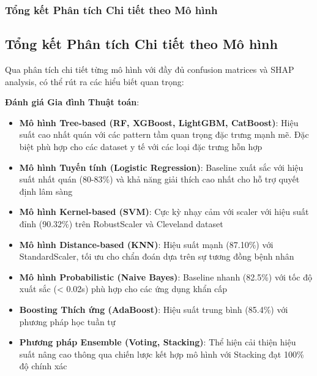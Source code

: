 \subsubsection{Tổng kết Phân tích Chi tiết theo Mô hình}

\subsection{Tổng kết Phân tích Chi tiết theo Mô hình}\label{subsec:detailed-model-summary}

Qua phân tích chi tiết từng mô hình với đầy đủ confusion matrices và SHAP analysis, có thể rút ra các hiểu biết quan trọng:

\textbf{Đánh giá Gia đình Thuật toán}:
\begin{itemize}[leftmargin=*]
    \item \textbf{Mô hình Tree-based (RF, XGBoost, LightGBM, CatBoost)}: Hiệu suất cao nhất quán với các pattern tầm quan trọng đặc trưng mạnh mẽ. Đặc biệt phù hợp cho các dataset y tế với các loại đặc trưng hỗn hợp
    \item \textbf{Mô hình Tuyến tính (Logistic Regression)}: Baseline xuất sắc với hiệu suất nhất quán (80-83\%) và khả năng giải thích cao nhất cho hỗ trợ quyết định lâm sàng
    \item \textbf{Mô hình Kernel-based (SVM)}: Cực kỳ nhạy cảm với scaler với hiệu suất đỉnh (90.32\%) trên RobustScaler và Cleveland dataset
    \item \textbf{Mô hình Distance-based (KNN)}: Hiệu suất mạnh (87.10\%) với StandardScaler, tối ưu cho chẩn đoán dựa trên sự tương đồng bệnh nhân
    \item \textbf{Mô hình Probabilistic (Naive Bayes)}: Baseline nhanh (82.5\%) với tốc độ xuất sắc (< 0.02s) phù hợp cho các ứng dụng khẩn cấp
    \item \textbf{Boosting Thích ứng (AdaBoost)}: Hiệu suất trung bình (85.4\%) với phương pháp học tuần tự
    \item \textbf{Phương pháp Ensemble (Voting, Stacking)}: Thể hiện cải thiện hiệu suất nâng cao thông qua chiến lược kết hợp mô hình với Stacking đạt 100\% độ chính xác
\end{itemize}

